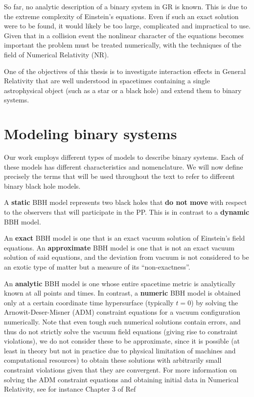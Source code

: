 So far, no analytic description of a binary system in GR is known. This is due to the extreme complexity of Einstein's equations. Even if such an exact solution were to be found, it would likely be too large, complicated and impractical to use. Given that in a collision event the nonlinear character of the equations becomes important the problem must be treated numerically, with the techniques of the field of Numerical Relativity (NR).

One of the objectives of this thesis is to investigate interaction effects in General Relativity that are well understood in spacetimes containing a single astrophysical object (such as a star or a black hole) and extend them to binary systems.

\section{Modeling binary systems}

Our work employs different types of models to describe binary systems. Each of these models has different characteristics and nomenclature.  We will now define precisely the terms that will be used throughout the text to refer to different binary black hole models.

\begin{definition}
  A \textbf{static} BBH model represents two black holes that \textbf{do not move} with respect to the observers that will participate in the PP. This is in contrast to a \textbf{dynamic} BBH model.
\end{definition}

\begin{definition}
  An \textbf{exact} BBH model is one that is an exact vacuum solution of Einstein's field equations. An \textbf{approximate} BBH model is one that is not an exact vacuum solution of said equations, and the deviation from vacuum is not considered to be an exotic type of matter but a measure of its ``non-exactness''.
\end{definition}

\begin{definition}
  An \textbf{analytic} BBH model is one whose entire spacetime metric is analytically known at all points and times. In contrast, a \textbf{numeric} BBH model is obtained only at a certain coordinate time hypersurface (typically $t=0$) by solving the Arnowit-Deser-Misner (ADM) constraint equations for a vacuum configuration numerically. Note that even tough such numerical solutions contain errors, and thus do not strictly solve the vacuum field equations (giving rise to constraint violations), we do not consider these to be approximate, since it is possible (at least in theory but not in practice due to physical limitation of machines and computational resources) to obtain these solutions with arbitrarily small constraint violations given that they are convergent. For more information on solving the ADM constraint equations and obtaining initial data in Numerical Relativity, see for instance Chapter 3 of Ref~\cite{Alcubierre2012-xp}
\end{definition}

